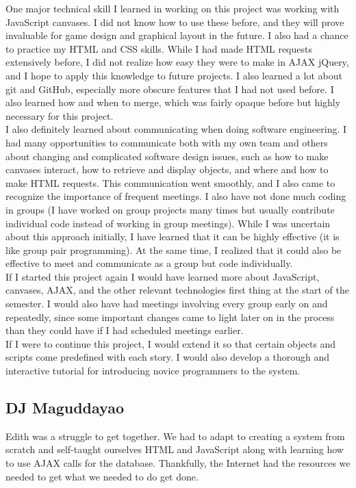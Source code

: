 \documentclass[12pt]{article}
\begin{document}
One major technical skill I learned in working on this project was working with JavaScript canvases. I did not know how to use these before, and they will prove invaluable for game design and graphical layout in the future. I also had a chance to practice my HTML and CSS skills. While I had made HTML requests extensively before, I did not realize how easy they were to make in AJAX jQuery, and I hope to apply this knowledge to future projects. I also learned a lot about git and GitHub, especially more obscure features that I had not used before. I also learned how and when to merge, which was fairly opaque before but highly necessary for this project. \\

I also definitely learned about communicating when doing software engineering. I had many opportunities to communicate both with my own team and others about changing and complicated software design issues, such as how to make canvases interact, how to retrieve and display objects, and where and how to make HTML requests. This communication went smoothly, and I also came to recognize the importance of frequent meetings. I also have not done much coding in groups (I have worked on group projects many times but usually contribute individual code instead of working in group meetings). While I was uncertain about this approach initially, I have learned that it can be highly effective (it is like group pair programming). At the same time, I realized that it could also be effective to meet and communicate as a group but code individually. \\

If I started this project again I would have learned more about JavaScript, canvases, AJAX, and the other relevant technologies first thing at the start of the semester. I would also have had meetings involving every group early on and repeatedly, since some important changes came to light later on in the process than they could have if I had scheduled meetings earlier. \\

If I were to continue this project, I would extend it so that certain objects and scripts come predefined with each story. I would also develop a thorough and interactive tutorial for introducing novice programmers to the system. 

\subsection{DJ Maguddayao}
Edith was a struggle to get together.  We had to adapt to creating a system from scratch and self-taught ourselves HTML and JavaScript along with learning how to use AJAX calls for the database.  Thankfully, the Internet had the resources we needed to get what we needed to do get done. \\
\end{document}
